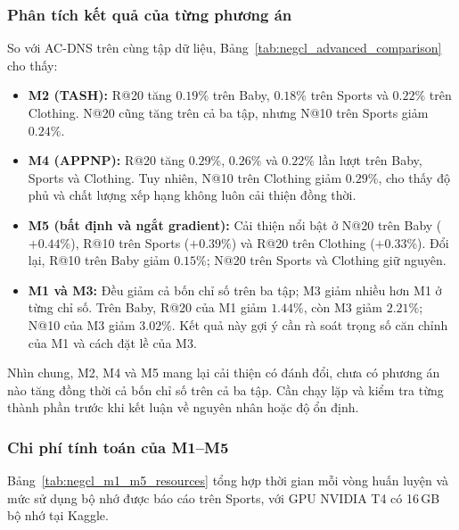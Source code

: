 \subsubsection{Phân tích kết quả của từng phương án}

So với AC-DNS trên cùng tập dữ liệu, Bảng~\ref{tab:negcl_advanced_comparison} cho thấy:
\begin{itemize}[leftmargin=*]
  \item \textbf{M2 (TASH):} R@20 tăng $0.19\%$ trên Baby, $0.18\%$ trên Sports và $0.22\%$ trên Clothing. N@20 cũng tăng trên cả ba tập, nhưng N@10 trên Sports giảm $0.24\%$.
  \item \textbf{M4 (APPNP):} R@20 tăng $0.29\%$, $0.26\%$ và $0.22\%$ lần lượt trên Baby, Sports và Clothing. Tuy nhiên, N@10 trên Clothing giảm $0.29\%$, cho thấy độ phủ và chất lượng xếp hạng không luôn cải thiện đồng thời.
  \item \textbf{M5 (bất định và ngắt gradient):} Cải thiện nổi bật ở N@20 trên Baby ($+0.44\%$), R@10 trên Sports ($+0.39\%$) và R@20 trên Clothing ($+0.33\%$). Đổi lại, R@10 trên Baby giảm $0.15\%$; N@20 trên Sports và Clothing giữ nguyên.
  \item \textbf{M1 và M3:} Đều giảm cả bốn chỉ số trên ba tập; M3 giảm nhiều hơn M1 ở từng chỉ số. Trên Baby, R@20 của M1 giảm $1.44\%$, còn M3 giảm $2.21\%$; N@10 của M3 giảm $3.02\%$. Kết quả này gợi ý cần rà soát trọng số căn chỉnh của M1 và cách đặt lề của M3.
\end{itemize}

Nhìn chung, M2, M4 và M5 mang lại cải thiện có đánh đổi, chưa có phương án nào tăng đồng thời cả bốn chỉ số trên cả ba tập. Cần chạy lặp và kiểm tra từng thành phần trước khi kết luận về nguyên nhân hoặc độ ổn định.

\subsubsection{Chi phí tính toán của M1--M5}
Bảng~\ref{tab:negcl_m1_m5_resources} tổng hợp thời gian mỗi vòng huấn luyện và mức sử dụng bộ nhớ được báo cáo trên Sports, với GPU NVIDIA T4 có 16\,GB bộ nhớ tại Kaggle.

